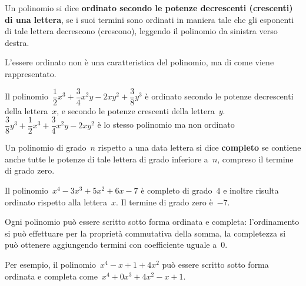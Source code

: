 \begin{definizione}{}{}
Un polinomio si dice \textbf{ordinato secondo le potenze decrescenti
(crescenti) di una lettera}, 
se i suoi termini sono ordinati in maniera tale che gli esponenti di tale 
lettera decrescono (crescono), leggendo il polinomio da sinistra verso 
destra.
\end{definizione}

L'essere ordinato non è una caratteristica del polinomio, ma di come 
viene rappresentato.

\begin{esempio}{}{}
Il polinomio~\(\dfrac{1}{2}x^3+\dfrac{3}{4}x^2y-2xy^2+\dfrac{3}{8}y^3\) 
è ordinato secondo le potenze decrescenti della lettera~\(x\), e secondo 
le potenze crescenti della lettera~\(y\).\\
\(\dfrac{3}{8}y^3+\dfrac{1}{2}x^3+\dfrac{3}{4}x^2y-2xy^2\) è lo stesso
polinomio ma non ordinato
\end{esempio}

\begin{definizione}{}{}
Un polinomio di grado~\(n\) rispetto a una data lettera si dice 
\textbf{completo} se contiene
anche tutte le potenze di tale lettera di grado 
inferiore a~\(n\), compreso il termine di grado zero.
\end{definizione}

\begin{esempio}{}{}
Il polinomio~\(x^4-3x^3+5x^2+6x-7\) è completo di 
grado~\(4\) e inoltre risulta ordinato rispetto alla lettera~\(x\). Il 
termine di grado zero è~\(-7\).
\end{esempio}

\begin{osservazione}{}{}
Ogni polinomio può essere scritto sotto forma ordinata e completa: 
l'ordinamento si può effettuare per la proprietà commutativa della 
somma, 
la completezza si può ottenere aggiungendo termini 
con coefficiente uguale a~\(0\).

Per esempio, il polinomio~\(x^4-x+1+4x^2\) può essere scritto sotto forma 
ordinata e completa come~\(x^4+0x^3+4x^2-x+1\).
\end{osservazione}


